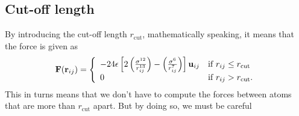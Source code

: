 \subsection{Cut-off length}
By introducing the cut-off length $r_\text{cut}$, mathematically speaking, it means that the force is given as
\begin{align}
	\vec F(\vec r_{ij}) = \left\{
	\begin{array}{l l}
		-24\epsilon\left[2\left(\frac{\sigma^{12}}{r_{ij}^{13}}\right) - \left(\frac{\sigma^6}{r_{ij}^7}\right)\right]\vec u_{ij} & \text{if } r_{ij} \leq r_\text{cut}\\
		0 & \text{if } r_{ij} > r_\text{cut}.
	\end{array}\right .
\end{align}
This in turns means that we don't have to compute the forces between atoms that are more than $r_\text{cut}$ apart. But by doing so, we must be careful